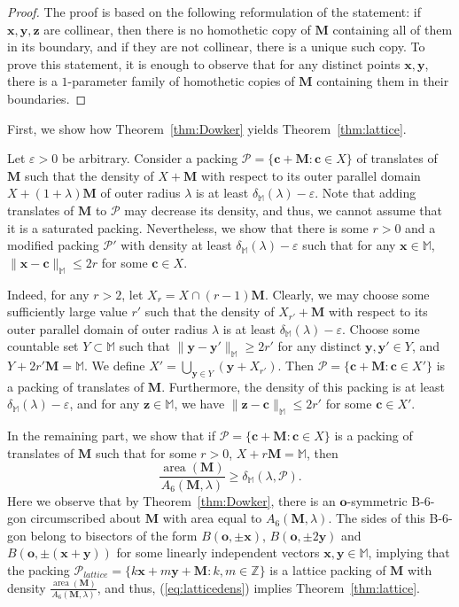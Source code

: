 \documentclass[11pt]{amsart}
\newcommand{\M}{\mathbb{M}}
\newcommand{\MM}{\mathbf{M}}
\renewcommand{\P}{\mathcal{P}}
\newcommand{\z}{\mathbf{z}}
\newcommand{\y}{\mathbf{y}}
\newcommand{\x}{\mathbf{x}}
\renewcommand{\o}{\mathbf{o}}
\DeclareMathOperator{\area}{area}
\renewcommand{\c}{\mathbf{c}}
\theoremstyle{definition}
\numberwithin{equation}{section}
\begin{document}
\begin{proof}
The proof is based on the following reformulation of the statement: if $\x,\y,\z$ are collinear, then there is no homothetic copy of $\MM$ containing all of them in its boundary, and if they are not collinear, there is a unique such copy. To prove this statement, it is enough to observe that for any distinct points $\x,\y$, there is a $1$-parameter family of homothetic copies of $\MM$ containing them in their boundaries.
\end{proof}

First, we show how Theorem~\ref{thm:Dowker} yields Theorem~\ref{thm:lattice}.

Let $\varepsilon > 0$ be arbitrary. Consider a packing $\P = \{ \c + \MM : \c \in X \}$ of translates of $\MM$ such that the density of $X+\MM$ with respect to its outer parallel domain $X+ (1+\lambda) \MM$ of outer radius $\lambda$ is at least $\delta_{\M}(\lambda) - \varepsilon$. Note that adding translates of $\MM$ to $\P$ may decrease its density, and thus, we cannot assume that it is a saturated packing. Nevertheless, we show that there is some $r > 0$ and a modified packing $\P'$ with density at least $\delta_{ \M}(\lambda) - \varepsilon$ such that for any $\x \in { \M}$, $\| \x -\c \|_{ \M} \leq 2r$ for some $\c \in X$.

Indeed, for any $r > 2$, let $X_r = X \cap (r-1) \MM$. Clearly, we may choose some sufficiently large value $r'$ such that the density of $X_{r'} + \MM$ with respect to its outer parallel domain of outer radius $\lambda$ is at least $\delta_{\M}(\lambda) - \varepsilon$. Choose some countable set $Y \subset {\M}$ such that $\| \y - \y' \|_{\M} \geq 2r'$ for any distinct $\y, \y' \in Y$, and $ Y + 2r'\MM = \M$. We define $X' = \bigcup_{\y \in Y} (\y+ X_{r'})$. Then $\P = \{ \c + \MM : \c \in X' \}$ is a packing of translates of $\MM$. Furthermore, the density of this packing is at least $\delta_{\M}(\lambda) - \varepsilon$, and for any $\z \in {\M}$, we have $\| \z-\c \|_{ \M} \leq 2r'$ for some $\c \in X'$.

In the remaining part, we show that if $\P = \{ \c + \MM : \c \in X \}$ is a packing of translates of $\MM$ such that for some $r > 0$, $X + r \MM = {\M}$, then
\begin{equation}\label{eq:latticedens}
\frac{\area(\MM)}{A_6(\MM, \lambda)} \geq \delta_{\M}(\lambda, \P).
\end{equation}
Here we observe that by Theorem~\ref{thm:Dowker}, there is an $\o$-symmetric B-$6$-gon circumscribed about $\MM$ with area equal to $A_6(\MM, \lambda)$. The sides of this B-$6$-gon belong to bisectors of the form $B(\o, \pm \x)$, $B(\o, \pm 2\y)$ and $B(\o, \pm( \x +\y) )$ for some linearly independent vectors $\x, \y \in \M$, implying that the packing $\P_{lattice} = \{ k \x + m \y + \MM : k,m \in \mathbb{Z} \}$ is a lattice packing of $\MM$ with density $\frac{\area(\MM)}{A_6(\MM, \lambda)}$, and thus, (\ref{eq:latticedens}) implies Theorem~\ref{thm:lattice}.
\end{document}
